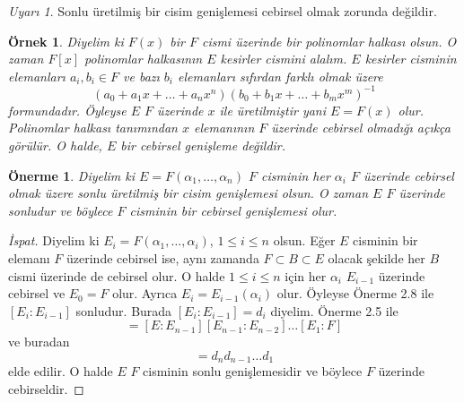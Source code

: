\documentclass[draft]{article}
\newtheorem{prop}[thm]{Önerme}
\newtheorem{exmp}{Örnek}
\theoremstyle{definition}
\theoremstyle{remark}
\newtheorem{rem}{Uyarı}[section]
\begin{document}
            \begin{rem}
                Sonlu üretilmiş bir cisim genişlemesi cebirsel olmak zorunda değildir.
            \end{rem}
            
             \begin{exmp}
                Diyelim ki $F(x)$ bir $F$ cismi üzerinde bir polinomlar halkası olsun. O zaman $F[x]$ polinomlar halkasının $E$ kesirler cismini alalım. $E$ kesirler cisminin elemanları $a_i, b_i \in F$ ve bazı $b_i$ elemanları sıfırdan farklı olmak üzere
                \begin{equation*}
                    (a_0 + a_1x + \dots + a_nx^n)(b_0 + b_1x + \dots + b_mx^m)^{-1}
                \end{equation*}
                formundadır. Öyleyse $E$ $F$ üzerinde $x$ ile üretilmiştir yani $E = F(x)$ olur. Polinomlar halkası tanımından $x$ elemanının $F$ üzerinde cebirsel olmadığı açıkça görülür. O halde, $E$ bir cebirsel genişleme değildir.
            \end{exmp}
            
            \begin{prop}
                Diyelim ki $E = F(\alpha_1, \dots, \alpha_n)$ $F$ cisminin her $\alpha_i$ $F$ üzerinde cebirsel olmak üzere sonlu üretilmiş bir cisim genişlemesi olsun. O zaman $E$ $F$ üzerinde sonludur ve böylece $F$ cisminin bir cebirsel genişlemesi olur.
            \end{prop}
            
            \begin{proof}[İspat]
                Diyelim ki $E_i = F(\alpha_1, \dots, \alpha_i)$, $1 \leq i \leq n$ olsun. Eğer $E$ cisminin bir elemanı $F$ üzerinde cebirsel ise, aynı zamanda $F \subset B \subset E$ olacak şekilde her $B$ cismi üzerinde de cebirsel olur. O halde $1 \leq i \leq n$ için her $\alpha_i$ $E_{i - 1}$ üzerinde cebirsel ve $E_0 = F$ olur. Ayrıca $E_i = E_{i - 1}(\alpha_i)$ olur. Öyleyse Önerme 2.8 ile $[E_i : E_{i - 1}]$ sonludur. Burada $[E_i : E_{i - 1}] = d_i$ diyelim. Önerme 2.5 ile
                \begin{equation*}
                    [E:F] = [E:E_{n - 1}][E_{n - 1}:E_{n - 2}] \dots [E_1:F]
                \end{equation*}
                ve buradan
                \begin{equation*}
                    [E:F] = d_nd_{n - 1} \dots d_1
                \end{equation*}
                elde edilir. O halde $E$ $F$ cisminin sonlu genişlemesidir ve böylece $F$ üzerinde cebirseldir.
            \end{proof}
            
\end{document}
